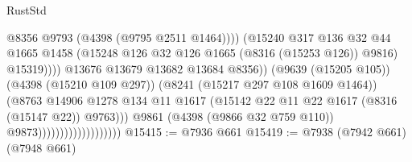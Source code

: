 \begin{lexlean}{RustStd}
\begin{coremodule}
                                                          @8356
                                                          @9793
                                                          (@4398 (@9795 @2511 @1464))))
                                                      (@15240
                                                        @317
                                                        @136
                                                        @32
                                                        @44
                                                        @1665
                                                        @1458
                                                        (@15248
                                                          @126
                                                          @32
                                                          @126
                                                          @1665
                                                          (@8316 (@15253 @126))
                                                          @9816)
                                                        @15319))))
                                                @13676
                                                @13679
                                                @13682
                                                @13684
                                                @8356))
                                            (@9639 (@15205 @105))
                                            (@4398 (@15210 @109 @297))
                                            (@8241 (@15217 @297 @108 @1609 @1464))
                                            (@8763
                                              @14906
                                              @1278
                                              @134
                                              @11
                                              @1617
                                              (@15142
                                                @22
                                                @11
                                                @22
                                                @1617
                                                (@8316 (@15147 @22))
                                                @9763)))
                                          @9861
                                          (@4398 (@9866 @32 @759 @110))
                                          @9873)))))))))))))))))))
@15415 := @7936 @661
@15419 := @7938 (@7942 @661) (@7948 @661)

\end{coremodule}
\end{lexlean}
